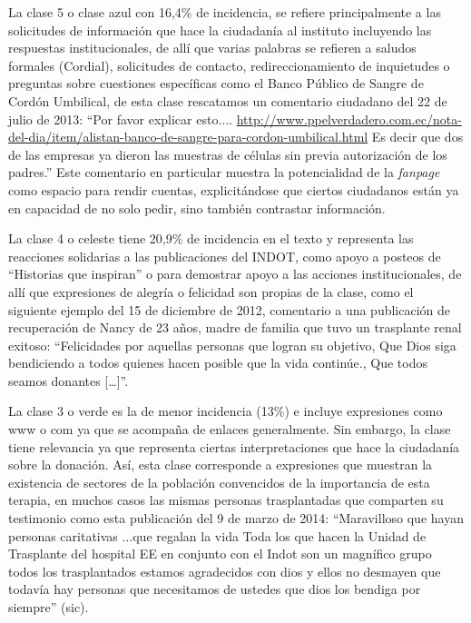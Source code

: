 \documentclass[spanish]{textolivre}
\begin{document}
La clase 5 o clase azul con 16,4\% de incidencia, se refiere principalmente a las solicitudes de información que hace la ciudadanía al instituto incluyendo las respuestas institucionales, de allí que varias palabras se refieren a saludos formales (Cordial), solicitudes de contacto, redireccionamiento de inquietudes o preguntas sobre cuestiones específicas como el Banco Público de Sangre de Cordón Umbilical, de esta clase rescatamos un comentario ciudadano del 22 de julio de 2013: “Por favor explicar esto.... \url{ http://www.ppelverdadero.com.ec/nota-del-dia/item/alistan-banco-de-sangre-para-cordon-umbilical.html} Es decir que dos de las empresas ya dieron las muestras de células sin previa autorización de los padres.” Este comentario en particular muestra la potencialidad de la \emph{fanpage} como espacio para rendir cuentas, explicitándose que ciertos ciudadanos están ya en capacidad de no solo pedir, sino también contrastar información.

La clase 4 o celeste tiene 20,9\% de incidencia en el texto y representa las reacciones solidarias a las publicaciones del INDOT, como apoyo a posteos de  “Historias que inspiran” o para demostrar apoyo a las acciones institucionales, de allí que expresiones de alegría o felicidad son propias de la clase, como el siguiente ejemplo del 15 de diciembre de 2012, comentario a una publicación de recuperación de Nancy de 23 años, madre de familia que tuvo un trasplante renal exitoso: “Felicidades por aquellas personas que logran su objetivo, Que Dios siga bendiciendo a todos quienes hacen posible que la vida continúe., Que todos seamos donantes […]”. 

La clase 3 o verde es la de menor incidencia (13\%) e incluye expresiones como www o com ya que se acompaña de enlaces generalmente. Sin embargo, la clase tiene relevancia ya que representa ciertas interpretaciones que hace la ciudadanía sobre la donación. Así, esta clase corresponde a expresiones que muestran la existencia de sectores de la población convencidos de la importancia de esta terapia, en muchos casos las mismas personas trasplantadas que comparten su testimonio como esta publicación del 9 de marzo de 2014: “Maravilloso que hayan personas caritativas ...que regalan la vida Toda los que hacen la Unidad de Trasplante del hospital EE en conjunto con el Indot son un magnífico grupo todos los trasplantados estamos agradecidos con dios y ellos no desmayen que todavía hay personas que necesitamos de ustedes que dios los bendiga por siempre” (sic).
\end{document}
